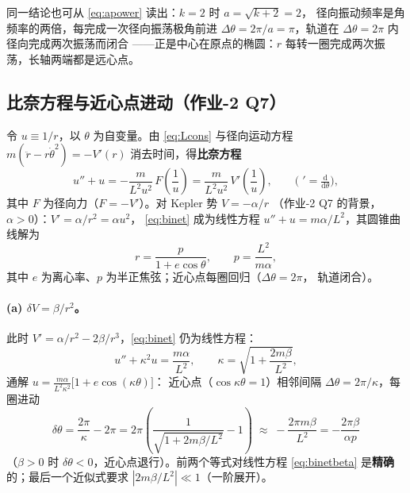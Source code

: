 \documentclass[UTF8,a4paper,11pt]{ctexart}
\begin{document}
同一结论也可从 \eqref{eq:apower} 读出：$k=2$ 时 $a=\sqrt{k+2}=2$，
径向振动频率是角频率的两倍，每完成一次径向振荡极角前进
$\Delta\theta=2\pi/a=\pi$，轨道在 $\Delta\theta=2\pi$ 内径向完成两次振荡而闭合
——正是中心在原点的椭圆：$r$ 每转一圈完成两次振荡，长轴两端都是远心点。

\subsection{比奈方程与近心点进动（作业-2 Q7）}
\label{sub:binet}

令 $u\equiv1/r$，以 $\theta$ 为自变量。由 \eqref{eq:Lcons} 与径向运动方程
$m(\ddot r-r\dot\theta^2)=-V'(r)$ 消去时间，得\textbf{比奈方程}
\begin{equation}
  u''+u=-\frac{m}{L^2u^2}\,F\!\left(\frac1u\right)
       =\frac{m}{L^2u^2}\,V'\!\left(\frac1u\right),
  \qquad \bigl(\;'=\tfrac{\mathrm{d}}{\mathrm{d}\theta}\bigr),
  \label{eq:binet}
\end{equation}
其中 $F$ 为径向力（$F=-V'$）。对 Kepler 势 $V=-\alpha/r$
（作业-2 Q7 的背景，$\alpha>0$）：$V'=\alpha/r^2=\alpha u^2$，
\eqref{eq:binet} 成为线性方程 $u''+u=m\alpha/L^2$，其圆锥曲线解为
\begin{equation}
  r=\frac{p}{1+e\cos\theta},
  \qquad p=\frac{L^2}{m\alpha},
  \label{eq:keporbit}
\end{equation}
其中 $e$ 为离心率、$p$ 为半正焦弦；近心点每圈回归（$\Delta\theta=2\pi$，
轨道闭合）。

\paragraph{(a) $\delta V=\beta/r^2$。}
此时 $V'=\alpha/r^2-2\beta/r^3$，\eqref{eq:binet} 仍为线性方程：
\begin{equation}
  u''+\kappa^2u=\frac{m\alpha}{L^2},
  \qquad
  \kappa=\sqrt{1+\frac{2m\beta}{L^2}},
  \label{eq:binetbeta}
\end{equation}
通解 $u=\frac{m\alpha}{L^2\kappa^2}\bigl[1+e\cos(\kappa\theta)\bigr]$：
近心点（$\cos\kappa\theta=1$）相邻间隔 $\Delta\theta=2\pi/\kappa$，每圈进动
\begin{equation}
  \boxed{\;\delta\theta=\frac{2\pi}{\kappa}-2\pi
  =2\pi\!\left(\frac{1}{\sqrt{1+2m\beta/L^2}}-1\right)
  \;\approx\;-\frac{2\pi m\beta}{L^2}=-\frac{2\pi\beta}{\alpha p}\;}
  \label{eq:precessbeta}
\end{equation}
（$\beta>0$ 时 $\delta\theta<0$，近心点退行）。前两个等式对线性方程
\eqref{eq:binetbeta} 是\textbf{精确}的；最后一个近似式要求
$|2m\beta/L^2|\ll1$（一阶展开）。
\end{document}
